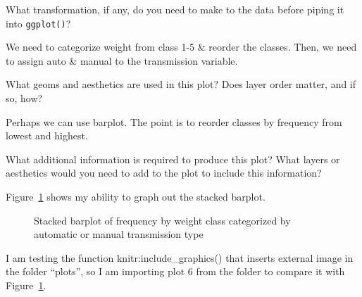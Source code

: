\documentclass[
  man,
  floatsintext,
  longtable,
  nolmodern,
  notxfonts,
  notimes,
  colorlinks=true,linkcolor=blue,citecolor=blue,urlcolor=blue]{apa7}
\begin{document}
What transformation, if any, do you need to make to the data before
piping it into \texttt{ggplot()}?

We need to categorize weight from class 1-5 \& reorder the classes.
Then, we need to assign auto \& manual to the transmission variable.

What geoms and aesthetics are used in this plot? Does layer order
matter, and if so, how?

Perhaps we can use barplot. The point is to reorder classes by frequency
from lowest and highest.

What additional information is required to produce this plot? What
layers or aesthetics would you need to add to the plot to include this
information?

Figure~\ref{fig-plot6-stacked-barplot} shows my ability to graph out the
stacked barplot.

\begin{figure}[H]

\caption{\label{fig-plot6-stacked-barplot}Stacked barplot of frequency
by weight class categorized by automatic or manual transmission type}


\end{figure}%

I am testing the function knitr:include\_graphics() that inserts
external image in the folder ``plots'', so I am importing plot 6 from
the folder to compare it with Figure~\ref{fig-plot6-stacked-barplot}.
\end{document}
